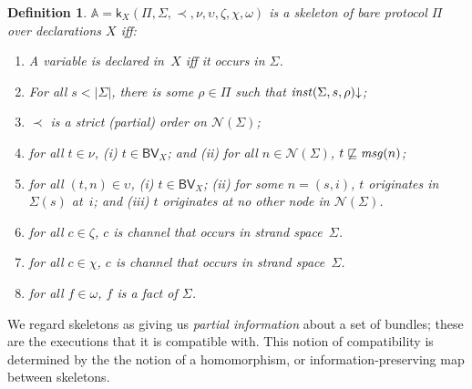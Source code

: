 \documentclass[12pt]{article}
\newcommand{\defd}{\mathord\downarrow}
\newcommand{\skel}{\mathbb{A}}
\newcommand{\skl}{\mathsf{k}}
\newcommand{\nodes}{\ensuremath{\mathcal{N}}}
\newcommand{\length}[1]{\ensuremath{|#1|}}
\renewcommand{\alg}[1]{\ensuremath{\mathsf{#1}}}
\newcommand{\atm}{\alg{BV}}
\newcommand{\ssp}{\Sigma}
\newcommand{\mess}{\fn{msg}}
\newtheorem{definition}{Definition}
\begin{document}
\begin{definition}\label{def:skeleton}
  $\skel=\skl_X(\Pi,\ssp,\prec,\nu,\upsilon,\zeta,\chi,\omega)$ is a
  \emph{skeleton of} bare protocol $\Pi$ over declarations $X$ iff:
%
  \begin{enumerate}
    \item A variable is declared in~$X$ iff it occurs in $\ssp$.
    \item For all $s<\length{\ssp}$, there is some $\rho\in\Pi$ such
      that $\fn{inst}(\ssp,s,\rho)\defd$;
    \item $\prec$ is a strict (partial) order on $\nodes(\ssp)$;
    \item for all $t\in\nu$, (i) $t\in\atm_X$; and (ii) for all
    $n\in\nodes(\ssp)$, $t\not\sqsubseteq\mess(n)$;
    \item for all $(t,n)\in\upsilon$, (i) $t\in\atm_X$; (ii) for some
      $n=(s,i)$, $t$ originates in $\ssp(s)$ at~$i$; and (iii) $t$
      originates at no other node in $\nodes(\ssp)$.
    \item for all $c\in\zeta$, $c$ is channel that occurs in strand
      space~$\Sigma$.
    \item for all $c\in\chi$, $c$ is channel that occurs in strand
      space~$\Sigma$.
    \item for all $f\in\omega$, $f$ is a fact of $\ssp$.
  \end{enumerate}
%
\end{definition}

We regard skeletons as giving us \emph{partial information} about a
set of bundles; these are the executions that it is compatible with.
This notion of compatibility is determined by the the notion of a
homomorphism, or information-preserving map between skeletons.
\end{document}
